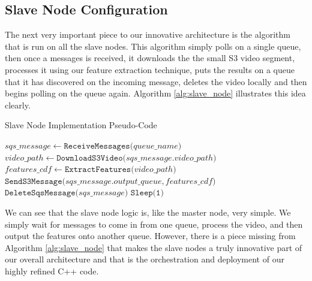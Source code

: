 \subsection{\label{subsection:slave_node}Slave Node Configuration }
The next very important piece to our innovative architecture is the algorithm
that is run on all the slave nodes. This algorithm simply polls on a single
queue, then once a messages is received, it downloads the the small S3 video
segment, processes it using our feature extraction technique, puts the results
on a queue that it has discovered on the incoming message, deletes the video
locally and then begins polling on the queue again. Algorithm \ref{alg:slave_node}
illustrates this idea clearly.

\begin{algorithm}
\caption{Slave Node Implementation Pseudo-Code}
\label{alg:slave_node}
\begin{algorithmic}[1]

    \State $sqs\_message \gets \texttt{ReceiveMessages(} queue\_name \texttt{)}$ 
    \State $video\_path \gets \texttt{DownloadS3Video(} sqs\_message.video\_path \texttt{)}$
    \State $features\_cdf \gets \texttt{ExtractFeatures(} video\_path \texttt{)}$ 
    \State $\texttt{SendS3Message(} sqs\_message.output\_queue, features\_cdf \texttt{)}$
    \State $\texttt{DeleteSqsMessage(} sqs\_message \texttt{)}$ 
    \State $\texttt{Sleep(1)}$
  \EndWhile
\end{algorithmic}
\end{algorithm}

We can see that the slave node logic is, like the master node, very simple. We
simply wait for messages to come in from one queue, process the video, and then
output the features onto another queue. However, there is a piece missing from
Algorithm \ref{alg:slave_node} that makes the slave nodes a truly innovative
part of our overall architecture and that is the orchestration and deployment
of our highly refined C++ code.

